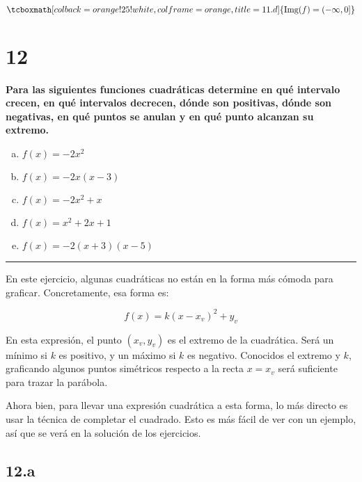 \documentclass{article}
\newcommand{\hresult}[2]{\tcboxmath[colback=orange!25!white,colframe=orange, title=#1] {#2} }
\newcommand{\sectionx}[1]{\section*{#1}\label{sec:#1}\addcontentsline{toc}{section}{\nameref{sec:#1}}}
\begin{document}
\begin{equation}
\hresult{11.d}{ \mathop{\text{Img}}(f) = (-\infty, 0] }
\end{equation}

\sectionx{12}

\textbf{Para las siguientes funciones cuadráticas determine en qué intervalo crecen, en qué intervalos decrecen, dónde son positivas, dónde son negativas, en qué puntos se anulan y en qué punto alcanzan su extremo.}

\begin{enumerate}[(a)]

\bfseries

\item $f(x) = -2x^2$

\item $f(x) = -2x (x-3)$

\item $f(x) = -2x^2 + x$

\item $f(x) = x^2 + 2x + 1$

\item $f(x) = -2 (x+3) (x-5)$

\end{enumerate}

\hrule
\vspace{1em}

En este ejercicio, algunas cuadráticas no están en la forma más cómoda para graficar. Concretamente, esa forma es:

\begin{equation}
f(x) = k (x - x_v)^2 + y_v
\end{equation}

En esta expresión, el punto $(x_v, y_v)$ es el extremo de la cuadrática. Será un mínimo si $k$ es positivo, y un máximo si $k$ es negativo. Conocidos el extremo y $k$, graficando algunos puntos simétricos respecto a la recta $x = x_v$ será suficiente para trazar la parábola.

Ahora bien, para llevar una expresión cuadrática a esta forma, lo más directo es usar la técnica de completar el cuadrado. Esto es más fácil de ver con un ejemplo, así que se verá en la solución de los ejercicios.

\subsection*{12.a}
\label{subsec:12.a}
\end{document}
